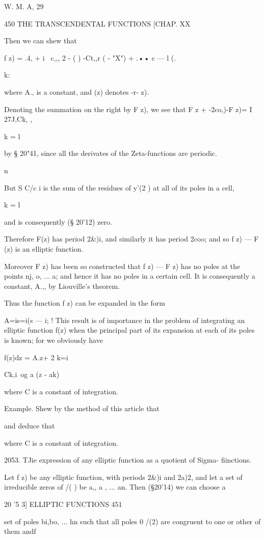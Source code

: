 {W. M. A, 29

450 THE TRANSCENDENTAL FUNCTIONS [CHAP. XX

Then we can shew that

f z) = .4, + i \ c,,, 2 - ( ) -Ct,,r ( - "X") + .•• c — l (.

k:

where A., is a constant, and (z) denotes -r- z).

Denoting the summation on the right by F z), we see that F z +
-2co,)-F z)= I 27J,Ck, ,

k = l

by § 20"41, since all the derivates of the Zeta-functions are
periodic.

n

But S C/c i is the sum of the residues of y'(2 ) at all of its poles
in a cell,

k = l

and is consequently (§ 20'12) zero.

Therefore F(z) has period 2\&)i, and similarly it has period 2coo; and
so f z) — F (z) is an elliptic function.

Moreover F z) has been so constructed that f z) — F z) has no poles at
the points nj, o, ... a; and hence it has no poles in a certain cell.
It is consequently a constant, A.,, by Liouville's theorem.

Thus the function f z) can be expanded in the form

A=is=i(s — i; ! This result is of importance in the problem of
integrating an elliptic function f(z) when the principal part of its
expansion at each of its poles is known; for we obviously have

f(z)dz = A.z+ 2 k=i

Ck,i\ og a (z - ak)

where C is a constant of integration.

Example. Shew by the method of this article that

and deduce that

where C is a constant of integration.

2053. TJie expression of any elliptic function as a quotient of Sigma-
fiinctions.

Let f z) be any elliptic function, with periods 2\&)i and 2a)2, and
let a set of irreducible zeros of /( ) be a,, a , ... an. Then
(§20'14) we can choose a

20 '5 3] ELLIPTIC FUNCTIONS 451

set of poles bi,bo, ... hn such that all poles 0 /(2) are congruent to
one or other of them andf

}
